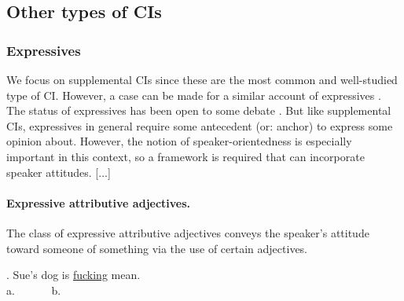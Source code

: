 \subsection{Other types of CIs}
\subsubsection{Expressives}

We focus on supplemental CIs since these are the most common and
well-studied type of CI.  However, a case can be made for a similar account
of expressives \citep[including expressive attributive adjectives, epithets,
honorifics, and tense-variations such as the German `Konjunktiv I';
cf.][]{potts2005logic}. The status of expressives has been open to some
debate \citep[...]{potts2004japanese,geurts2007fucking}.  But like
supplemental CIs, expressives in general require some antecedent (or:
anchor) to express some opinion about.
However,
the notion of speaker-orientedness is especially important in this context,
so a framework is required that can incorporate speaker attitudes.
[...]

\paragraph{Expressive attributive adjectives.} The class of expressive
attributive adjectives conveys the speaker's attitude toward someone of
something via the use of certain adjectives.

\noindent\parbox[b]{\textwidth}{
\ex. Sue's dog is \underline{fucking} mean.\\
a.~~~
~~~b.~~~

}

